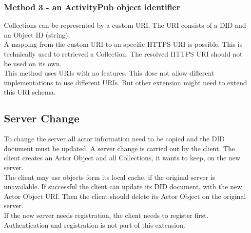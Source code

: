 \documentclass[conference]{IEEEtran}
\begin{document}
\subsubsection{Method 3 - an ActivityPub object identifier}
Collections can be represented by a custom URI. The URI consists of a DID and an Object ID (string). \\
A mapping from the custom URI to an specific HTTPS URI is possible. This is technically used to retrieved a Collection. The resolved HTTPS URI should not be used on its own.\\
This method uses URIs with no features. This dose not allow different implementations to use different URIs. But other extension might need to extend this URI schema.
\subsection{Server Change}
To change the server all actor information need to be copied and the DID document must be updated.
A server change is carried out by the client. The client creates an Actor Object and all Collections, it wants to keep, on the new server.\\
The client may use objects form its local cache, if the original server is unavailable. If successful the client can update its DID  document, with the new Actor Object URI. Then the client should delete its Actor Object on the original server.\\
If the new server needs registration, the client needs to register first. Authentication and registration is not part of this extension.
\end{document}
